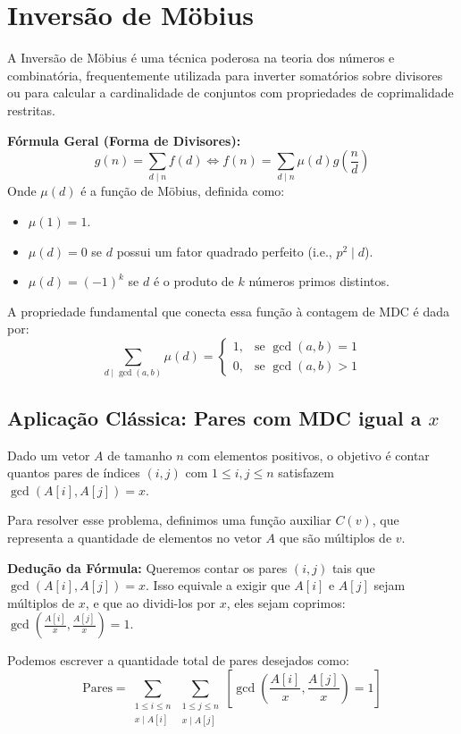 \section{Inversão de Möbius}

A Inversão de Möbius é uma técnica poderosa na teoria dos números e combinatória, frequentemente utilizada para inverter somatórios sobre divisores ou para calcular a cardinalidade de conjuntos com propriedades de coprimalidade restritas.

\textbf{Fórmula Geral (Forma de Divisores):}
$$ g(n) = \sum_{d \mid n} f(d) \iff f(n) = \sum_{d \mid n} \mu(d) g\left(\frac{n}{d}\right) $$
Onde $\mu(d)$ é a função de Möbius, definida como:
\begin{itemize}
    \item $\mu(1) = 1$.
    \item $\mu(d) = 0$ se $d$ possui um fator quadrado perfeito (i.e., $p^2 \mid d$).
    \item $\mu(d) = (-1)^k$ se $d$ é o produto de $k$ números primos distintos.
\end{itemize}

A propriedade fundamental que conecta essa função à contagem de MDC é dada por:
$$ \sum_{d \mid \gcd(a, b)} \mu(d) = \begin{cases} 1, & \text{se } \gcd(a, b) = 1 \\ 0, & \text{se } \gcd(a, b) > 1 \end{cases} $$

\subsection*{Aplicação Clássica: Pares com MDC igual a $x$}
Dado um vetor $A$ de tamanho $n$ com elementos positivos, o objetivo é contar quantos pares de índices $(i, j)$ com $1 \le i, j \le n$ satisfazem $\gcd(A[i], A[j]) = x$.

Para resolver esse problema, definimos uma função auxiliar $C(v)$, que representa a quantidade de elementos no vetor $A$ que são múltiplos de $v$.

\textbf{Dedução da Fórmula:}
Queremos contar os pares $(i, j)$ tais que $\gcd(A[i], A[j]) = x$. Isso equivale a exigir que $A[i]$ e $A[j]$ sejam múltiplos de $x$, e que ao dividi-los por $x$, eles sejam coprimos: $\gcd\left(\frac{A[i]}{x}, \frac{A[j]}{x}\right) = 1$.

Podemos escrever a quantidade total de pares desejados como:
$$ \text{Pares} = \sum_{\substack{1 \le i \le n \\ x \mid A[i]}} \sum_{\substack{1 \le j \le n \\ x \mid A[j]}} \left[ \gcd\left(\frac{A[i]}{x}, \frac{A[j]}{x}\right) = 1 \right] $$

